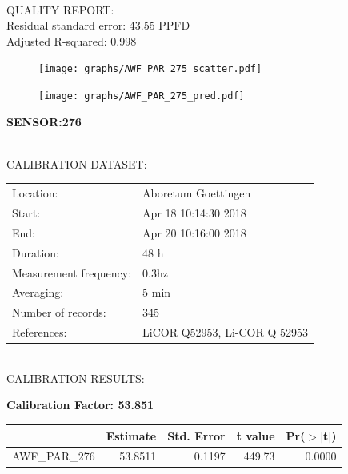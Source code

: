 \documentclass[oneside]{report}
\begin{document}
\hrulefill\\
QUALITY REPORT:\\
Residual standard error: 43.55 PPFD\\
Adjusted R-squared: 0.998



\begin{figure}[H]
  \centering
  \texttt{[image: graphs/AWF\_PAR\_275\_scatter.pdf]}
\end{figure}




\begin{figure}[H]
  \centering
  \texttt{[image: graphs/AWF\_PAR\_275\_pred.pdf]}
\end{figure}

\pagebreak


\begin{center}
\large{\textbf{SENSOR:276}}\\
\end{center}

\hrulefill\\
CALIBRATION DATASET:\\
\begin{table}[h!]
  \centering
  \label{tab:table1}
  \begin{tabular}{ll}
    Location: & Aboretum Goettingen\\ 
    
    
    Start:  & Apr 18 10:14:30 2018 \\
    End:   & Apr 20 10:16:00 2018\\ 
    Duration: & 48 h\\
    Measurement frequency: & 0.3hz\\
    Averaging:  &5 min\\
    Number of records: & 345 \\
    References: & LiCOR Q52953, Li-COR Q 52953 \\
  \end{tabular}
\end{table}

\hrulefill\\
CALIBRATION RESULTS:\\


\begin{center}
\textbf{\large{Calibration Factor: 53.851}}\\
\end{center}
\begin{table}[ht]
\centering
\begin{tabular}{rrrrr}
  \hline
 & Estimate & Std. Error & t value & Pr($>$$|$t$|$) \\ 
  \hline
AWF\_PAR\_276 & 53.8511 & 0.1197 & 449.73 & 0.0000 \\ 
   \hline
\end{tabular}
\end{table}
\end{document}
